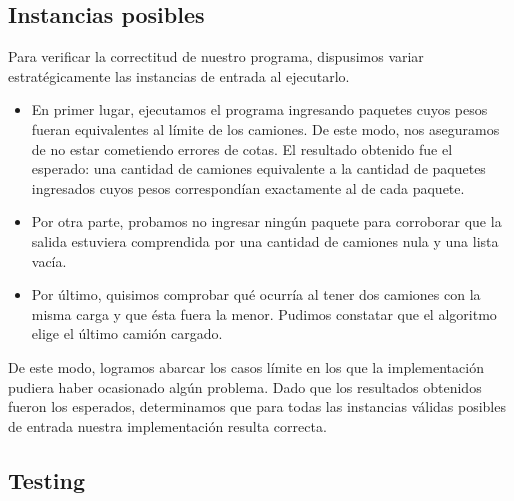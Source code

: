 \subsection{Instancias posibles}
Para verificar la correctitud de nuestro programa, dispusimos variar estratégicamente las instancias de entrada al ejecutarlo.\newline
\newline
\begin{itemize}
\item En primer lugar, ejecutamos el programa ingresando paquetes cuyos pesos fueran equivalentes al límite de los camiones. De este modo, nos aseguramos de no estar cometiendo errores de cotas. El resultado obtenido fue el esperado: una cantidad de camiones equivalente a la cantidad de paquetes ingresados cuyos pesos correspondían exactamente al de cada paquete.

\item Por otra parte, probamos no ingresar ningún paquete para corroborar que la salida estuviera comprendida por una cantidad de camiones nula y una lista vacía.

\item Por último, quisimos comprobar qué ocurría al tener dos camiones con la misma carga y que ésta fuera la menor. Pudimos constatar que el algoritmo elige el último camión cargado.
\end{itemize}

De este modo, logramos abarcar los casos límite en los que la implementación pudiera haber ocasionado algún problema. Dado que los resultados obtenidos fueron los esperados, determinamos que para todas las instancias válidas posibles de entrada nuestra implementación resulta correcta.

\subsection{Testing}
